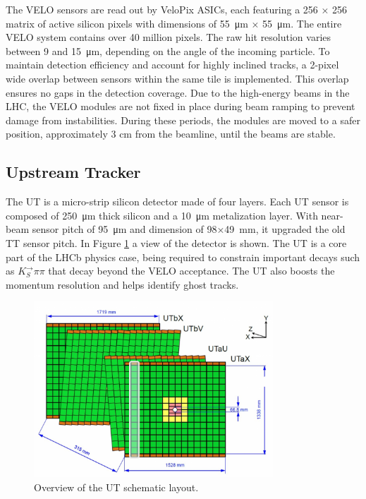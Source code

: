 The VELO sensors are read out by VeloPix ASICs, each featuring a 256 × 256 matrix of active silicon pixels with dimensions of \SI{55}{\micro\meter} × \SI{55}{\micro\meter}. The entire VELO system contains over 40 million pixels. The raw hit resolution varies between 9 and \SI{15}{\micro\meter}, depending on the angle of the incoming particle. To maintain detection efficiency and account for highly inclined tracks, a 2-pixel wide overlap between sensors within the same tile is implemented. This overlap ensures no gaps in the detection coverage.
Due to the high-energy beams in the LHC, the VELO modules are not fixed in place during beam ramping to prevent damage from instabilities. During these periods, the modules are moved to a safer position, approximately 3 cm from the beamline, until the beams are stable.

\subsection{Upstream Tracker}
The UT is a micro-strip silicon detector made of four layers\cite{LHCb:2014uqj}. Each UT sensor is composed of \SI{250}{\micro\meter} thick silicon and a \SI{10}{\micro\meter} metalization layer. With near-beam sensor pitch of \SI{95}{\micro\meter} and dimension of 98×\SI{49}{\milli\meter}, it upgraded the old TT sensor pitch. In Figure \ref{fig:UT} a view of the detector is shown\cite{ut}. 
The UT is a core part of the LHCb physics case, being required to constrain important decays such as $K_S^\rightarrow\pi\pi$ that decay beyond the VELO acceptance. The UT also boosts the momentum resolution and helps identify ghost tracks.

\begin{figure}
    \centering
    \includegraphics[width=0.8\textwidth]{figures/UT.png}
    \caption{Overview of the UT schematic layout.}
    \label{fig:UT}
\end{figure}

